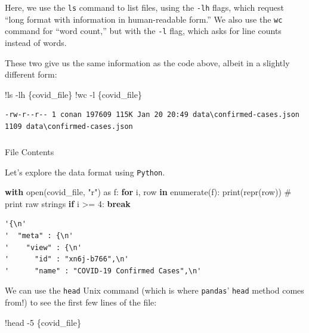 \documentclass[
  letterpaper,
  DIV=11,
  numbers=noendperiod]{scrreprt}
\makeatletter
\let\oldsubparagraph\subparagraph
\renewcommand{\subparagraph}{
    \@ifstar
      \xxxSubParagraphStar
      \xxxSubParagraphNoStar
  }
\newcommand{\xxxSubParagraphStar}[1]{\oldsubparagraph*{#1}\mbox{}}
\newcommand{\xxxSubParagraphNoStar}[1]{\oldsubparagraph{#1}\mbox{}}
\newenvironment{Shaded}{\begin{snugshade}}{\end{snugshade}}
\newcommand{\BuiltInTok}[1]{\textcolor[rgb]{0.00,0.23,0.31}{#1}}
\newcommand{\CommentTok}[1]{\textcolor[rgb]{0.37,0.37,0.37}{#1}}
\newcommand{\ControlFlowTok}[1]{\textcolor[rgb]{0.00,0.23,0.31}{\textbf{#1}}}
\newcommand{\DecValTok}[1]{\textcolor[rgb]{0.68,0.00,0.00}{#1}}
\newcommand{\ImportTok}[1]{\textcolor[rgb]{0.00,0.46,0.62}{#1}}
\newcommand{\KeywordTok}[1]{\textcolor[rgb]{0.00,0.23,0.31}{\textbf{#1}}}
\newcommand{\NormalTok}[1]{\textcolor[rgb]{0.00,0.23,0.31}{#1}}
\newcommand{\OperatorTok}[1]{\textcolor[rgb]{0.37,0.37,0.37}{#1}}
\newcommand{\StringTok}[1]{\textcolor[rgb]{0.13,0.47,0.30}{#1}}
\makeatother
\begin{document}
Here, we use the \texttt{ls} command to list files, using the
\texttt{-lh} flags, which request ``long format with information in
human-readable form.'' We also use the \texttt{wc} command for ``word
count,'' but with the \texttt{-l} flag, which asks for line counts
instead of words.

These two give us the same information as the code above, albeit in a
slightly different form:

\begin{Shaded}
\begin{Highlighting}[]
\OperatorTok{!}\NormalTok{ls }\OperatorTok{{-}}\NormalTok{lh \{covid\_file\}}
\OperatorTok{!}\NormalTok{wc }\OperatorTok{{-}}\NormalTok{l \{covid\_file\}}
\end{Highlighting}
\end{Shaded}

\begin{verbatim}
-rw-r--r-- 1 conan 197609 115K Jan 20 20:49 data\confirmed-cases.json
1109 data\confirmed-cases.json
\end{verbatim}

\subparagraph{File Contents}\label{file-contents}

Let's explore the data format using \texttt{Python}.

\begin{Shaded}
\begin{Highlighting}[]
\ControlFlowTok{with} \BuiltInTok{open}\NormalTok{(covid\_file, }\StringTok{"r"}\NormalTok{) }\ImportTok{as}\NormalTok{ f:}
    \ControlFlowTok{for}\NormalTok{ i, row }\KeywordTok{in} \BuiltInTok{enumerate}\NormalTok{(f):}
        \BuiltInTok{print}\NormalTok{(}\BuiltInTok{repr}\NormalTok{(row)) }\CommentTok{\# print raw strings}
        \ControlFlowTok{if}\NormalTok{ i }\OperatorTok{\textgreater{}=} \DecValTok{4}\NormalTok{: }\ControlFlowTok{break}
\end{Highlighting}
\end{Shaded}

\begin{verbatim}
'{\n'
'  "meta" : {\n'
'    "view" : {\n'
'      "id" : "xn6j-b766",\n'
'      "name" : "COVID-19 Confirmed Cases",\n'
\end{verbatim}

We can use the \texttt{head} Unix command (which is where
\texttt{pandas}' \texttt{head} method comes from!) to see the first few
lines of the file:

\begin{Shaded}
\begin{Highlighting}[]
\OperatorTok{!}\NormalTok{head }\OperatorTok{{-}}\DecValTok{5}\NormalTok{ \{covid\_file\}}
\end{Highlighting}
\end{Shaded}
\end{document}
